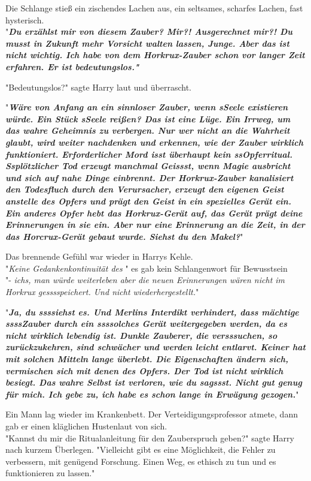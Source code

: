 {Die Schlange stieß ein zischendes Lachen aus, ein seltsames, scharfes Lachen, fast hysterisch.\\ "\textbf{\emph{Du erzählst mir von diesem Zauber? Mir?! Ausgerechnet mir?! Du musst in Zukunft mehr Vorsicht walten lassen, Junge. Aber das ist nicht wichtig. Ich habe von dem Horkrux-Zauber schon vor langer Zeit erfahren. Er ist bedeutungslos."}}

"Bedeutungslos?" sagte Harry laut und überrascht.

"\textbf{\emph{Wäre von Anfang an ein sinnloser Zauber, wenn sSeele existieren würde. Ein Stück sSeele reißen? Das ist eine Lüge. Ein Irrweg, um das wahre Geheimnis zu verbergen. Nur wer nicht an die Wahrheit glaubt, wird weiter nachdenken und erkennen, wie der Zauber wirklich funktioniert. Erforderlicher Mord isst überhaupt kein ssOpferritual. Ssplötzlicher Tod erzeugt manchmal Geissst, wenn Magie ausbricht und sich auf nahe Dinge einbrennt. Der Horkrux-Zauber kanalisiert den Todesfluch durch den Verursacher, erzeugt den eigenen Geist anstelle des Opfers und prägt den Geist in ein spezielles Gerät ein. Ein anderes Opfer hebt das Horkrux-Gerät auf, das Gerät prägt deine Erinnerungen in sie ein. Aber nur eine Erinnerung an die Zeit, in der das Horcrux-Gerät gebaut wurde. Siehst du den Makel?}}"

Das brennende Gefühl war wieder in Harrys Kehle.\\ "\emph{Keine Gedankenkontinuität des} " es gab kein Schlangenwort für Bewusstsein\\ "- \emph{ichs, man würde weiterleben aber die neuen Erinnerungen wären nicht im Horkrux gesssspeichert. Und nicht wiederhergestellt.}"

"\textbf{\emph{Ja, du ssssiehst es. Und Merlins Interdikt verhindert, dass mächtige ssssZauber durch ein ssssolches Gerät weitergegeben werden, da es nicht wirklich lebendig ist. Dunkle Zauberer, die versssuchen, so zurückzukehren, sind schwächer und werden leicht entlarvt. Keiner hat mit solchen Mitteln lange überlebt. Die Eigenschaften ändern sich, vermischen sich mit denen des Opfers. Der Tod ist nicht wirklich besiegt. Das wahre Selbst ist verloren, wie du sagssst. Nicht gut genug für mich. Ich gebe zu, ich habe es schon lange in Erwägung gezogen.}}"

Ein Mann lag wieder im Krankenbett. Der Verteidigungsprofessor atmete, dann gab er einen kläglichen Hustenlaut von sich.\\ "Kannst du mir die Ritualanleitung für den Zauberspruch geben?" sagte Harry nach kurzem Überlegen. "Vielleicht gibt es eine Möglichkeit, die Fehler zu verbessern, mit genügend Forschung. Einen Weg, es ethisch zu tun und es funktionieren zu lassen."

}
